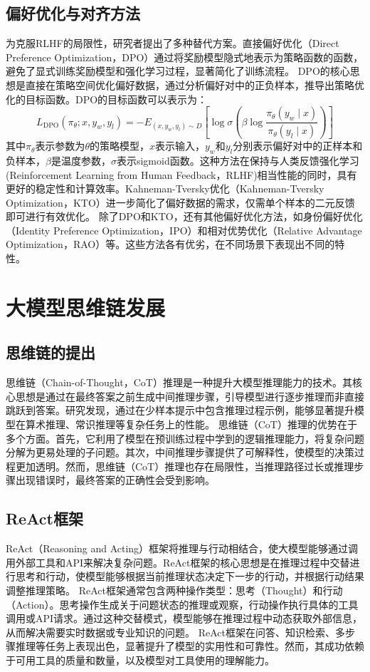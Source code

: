 \subsection{偏好优化与对齐方法}
为克服RLHF的局限性，研究者提出了多种替代方案。直接偏好优化（Direct Preference Optimization，DPO）通过将奖励模型隐式地表示为策略函数的函数，避免了显式训练奖励模型和强化学习过程，显著简化了训练流程\supercite{DBLP:conf/nips/RafailovSMMEF23}。
DPO的核心思想是直接在策略空间优化偏好数据，通过分析偏好对中的正负样本，推导出策略优化的目标函数。DPO的目标函数可以表示为：
\begin{equation}
L_{\mathrm{DPO}}(\pi_\theta; x, y_w, y_l) = -E_{(x, y_w, y_l) \sim D} \left[ \log \sigma \left( \beta \log \frac{\pi_\theta(y_w \mid x)}{\pi_\theta(y_l \mid x)} \right) \right]
\end{equation}
其中$\pi_\theta$表示参数为$\theta$的策略模型，$x$表示输入，$y_w$和$y_l$分别表示偏好对中的正样本和负样本，$\beta$是温度参数，$\sigma$表示sigmoid函数。这种方法在保持与人类反馈强化学习(Reinforcement Learning from Human Feedback，RLHF)相当性能的同时，具有更好的稳定性和计算效率。Kahneman-Tversky优化（Kahneman-Tversky Optimization，KTO）进一步简化了偏好数据的需求，仅需单个样本的二元反馈即可进行有效优化\supercite{DBLP:journals/corr/abs-2402-01306}。
除了DPO和KTO，还有其他偏好优化方法，如身份偏好优化（Identity Preference Optimization，IPO）和相对优势优化（Relative Advantage Optimization，RAO）等。这些方法各有优劣，在不同场景下表现出不同的特性。

\section{大模型思维链发展}
\subsection{思维链的提出}
思维链（Chain-of-Thought，CoT）推理是一种提升大模型推理能力的技术。其核心思想是通过在最终答案之前生成中间推理步骤，引导模型进行逐步推理而非直接跳跃到答案。研究发现，通过在少样本提示中包含推理过程示例，能够显著提升模型在算术推理、常识推理等复杂任务上的性能\supercite{DBLP:conf/nips/Wei0SBIXCLZ22}。
思维链（CoT）推理的优势在于多个方面。首先，它利用了模型在预训练过程中学到的逻辑推理能力，将复杂问题分解为更易处理的子问题。其次，中间推理步骤提供了可解释性，使模型的决策过程更加透明。然而，思维链（CoT）推理也存在局限性，当推理路径过长或推理步骤出现错误时，最终答案的正确性会受到影响。
\subsection{ReAct框架}
ReAct（Reasoning and Acting）框架将推理与行动相结合，使大模型能够通过调用外部工具和API来解决复杂问题。ReAct框架的核心思想是在推理过程中交替进行思考和行动，使模型能够根据当前推理状态决定下一步的行动，并根据行动结果调整推理策略\supercite{DBLP:conf/iclr/YaoZYDSN023}。
ReAct框架通常包含两种操作类型：思考（Thought）和行动（Action）。思考操作生成关于问题状态的推理或观察，行动操作执行具体的工具调用或API请求。通过这种交替模式，模型能够在推理过程中动态获取外部信息，从而解决需要实时数据或专业知识的问题。
ReAct框架在问答、知识检索、多步骤推理等任务上表现出色，显著提升了模型的实用性和可靠性。然而，其成功依赖于可用工具的质量和数量，以及模型对工具使用的理解能力。
